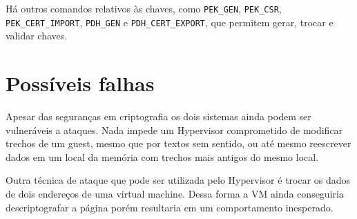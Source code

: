 \documentclass{report}
\begin{document}
Há outros comandos relativos às chaves, como \texttt{PEK\_GEN},
\texttt{PEK\_CSR}, \texttt{PEK\_CERT\_IMPORT}, \texttt{PDH\_GEN} e
\texttt{PDH\_CERT\_EXPORT}, que permitem gerar, trocar e validar chaves.

\section{Possíveis falhas}

Apesar das seguranças em criptografia os dois sistemas ainda podem ser
vulneráveis a ataques. Nada impede um Hypervisor comprometido de modificar
trechos de um guest, mesmo que por textos sem sentido, ou até mesmo reescrever
dados em um local da memória com trechos mais antigos do mesmo local.

Outra técnica de ataque que pode ser utilizada pelo Hypervisor é trocar os
dados de dois endereços de uma virtual machine. Dessa forma a VM ainda
conseguiria descriptografar a página porém resultaria em um comportamento
inesperado.


\nocite{*}

\end{document}
